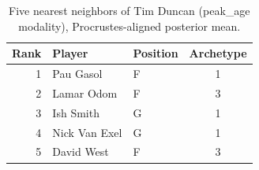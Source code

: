\begin{table}[htbp]
  \centering\small
  \begin{tabular}{rllc}
    \toprule
    Rank & Player & Position & Archetype \\
    \midrule
    1 & Pau Gasol & F & 1 \\
    2 & Lamar Odom & F & 3 \\
    3 & Ish Smith & G & 1 \\
    4 & Nick Van Exel & G & 1 \\
    5 & David West & F & 3 \\
    \bottomrule
  \end{tabular}
  \caption{Five nearest neighbors of Tim Duncan (peak_age modality), Procrustes-aligned posterior mean.}
  \label{tab:Tim_Duncan_neighbors_peak_age}
\end{table}

